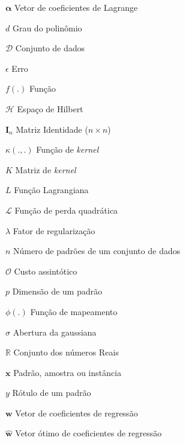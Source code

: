 \begin{simbolos}
    \item[$\boldsymbol{\alpha}$] Vetor de coeficientes de Lagrange
    \item[$d$] Grau do polinômio
    \item[$\mathcal{D}$] Conjunto de dados
    \item[$\epsilon$] Erro
    \item[$f(.)$] Função
    \item[$\mathcal{H}$] Espaço de Hilbert
    \item[$\mathbf{I}_n$] Matriz Identidade ($n \times n$)
    \item[$\kappa(.,.)$] Função de \textit{kernel}
    \item[$K$] Matriz de \textit{kernel}
    \item[$L$] Função Lagrangiana
    \item[$\mathcal{L}$] Função de perda quadrática
    \item[$\lambda$] Fator de regularização
    \item[$n$] Número de padrões de um conjunto de dados
    \item[$\mathcal{O}$] Custo assintótico
    \item[$p$] Dimensão de um padrão
    \item[$\phi(.)$] Função de mapeamento
    \item[$\sigma$] Abertura da gaussiana
    \item[$\mathbb{R}$] Conjunto dos números Reais
    \item[$\mathbf{x}$] Padrão, amostra ou instância
    \item[$y$] Rótulo de um padrão
    \item[$\mathbf{w}$] Vetor de coeficientes de regressão
    \item[$\mathbf{\hat{w}}$] Vetor ótimo de coeficientes de regressão
\end{simbolos}